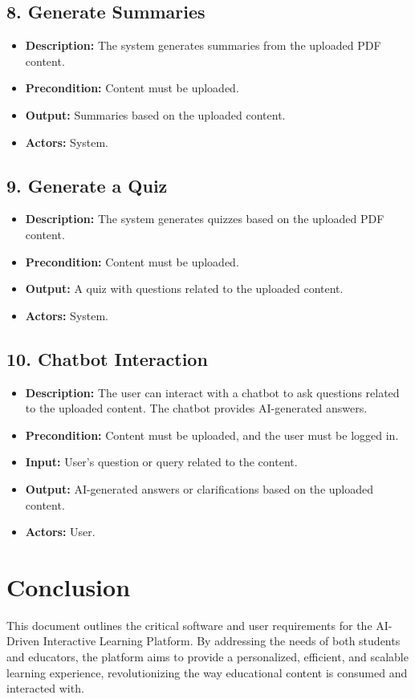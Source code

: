 \documentclass{article}
\begin{document}
\subsection*{8. Generate Summaries}
\begin{itemize}[left=0pt]
    \item \textbf{Description:} The system generates summaries from the uploaded PDF content.
    \item \textbf{Precondition:} Content must be uploaded.
    \item \textbf{Output:} Summaries based on the uploaded content.
    \item \textbf{Actors:} System.
\end{itemize}

\subsection*{9. Generate a Quiz}
\begin{itemize}[left=0pt]
    \item \textbf{Description:} The system generates quizzes based on the uploaded PDF content.
    \item \textbf{Precondition:} Content must be uploaded.
    \item \textbf{Output:} A quiz with questions related to the uploaded content.
    \item \textbf{Actors:} System.
\end{itemize}

\subsection*{10. Chatbot Interaction}
\begin{itemize}[left=0pt]
    \item \textbf{Description:} The user can interact with a chatbot to ask questions related to the uploaded content. The chatbot provides AI-generated answers.
    \item \textbf{Precondition:} Content must be uploaded, and the user must be logged in.
    \item \textbf{Input:} User's question or query related to the content.
    \item \textbf{Output:} AI-generated answers or clarifications based on the uploaded content.
    \item \textbf{Actors:} User.
\end{itemize}
\section{Conclusion}
This document outlines the critical software and user requirements for the AI-Driven Interactive Learning Platform. By addressing the needs of both students and educators, the platform aims to provide a personalized, efficient, and scalable learning experience, revolutionizing the way educational content is consumed and interacted with.
\end{document}
